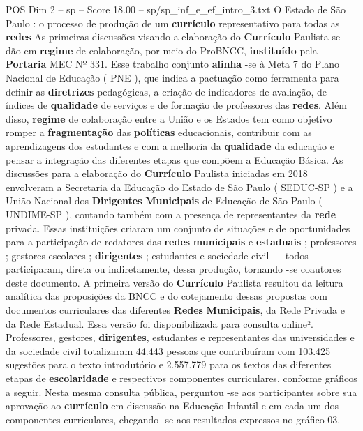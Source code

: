 \begin{textsample}{POS Dim 2 – sp – Score 18.00 – sp/sp\_inf\_e\_ef\_intro\_3.txt}  \label{ex:f2_pos_205}
O Estado de São Paulo : o processo de produção de um \textbf{currículo} representativo para todas as \textbf{redes} As primeiras discussões visando a elaboração do \textbf{Currículo} Paulista se dão em \textbf{regime} de colaboração, por meio do ProBNCC, \textbf{instituído} pela \textbf{Portaria} MEC Nº 331.
Esse trabalho conjunto \textbf{alinha} -se à Meta 7 do Plano Nacional de Educação ( PNE ), que indica a pactuação como ferramenta para definir as \textbf{diretrizes} pedagógicas, a criação de indicadores de avaliação, de índices de \textbf{qualidade} de serviços e de formação de professores das \textbf{redes}.
Além disso, \textbf{regime} de colaboração entre a União e os Estados tem como objetivo romper a \textbf{fragmentação} das \textbf{políticas} educacionais, contribuir com as aprendizagens dos estudantes e com a melhoria da \textbf{qualidade} da educação e pensar a integração das diferentes etapas que compõem a Educação Básica.
As discussões para a elaboração do \textbf{Currículo} Paulista iniciadas em 2018 envolveram a Secretaria da Educação do Estado de São Paulo ( SEDUC-SP ) e a União Nacional dos \textbf{Dirigentes} \textbf{Municipais} de Educação de São Paulo ( UNDIME-SP ), contando também com a presença de representantes da \textbf{rede} privada.
Essas instituições criaram um conjunto de situações e de oportunidades para a participação de redatores das \textbf{redes} \textbf{municipais} e \textbf{estaduais} ; professores ; gestores escolares ; \textbf{dirigentes} ; estudantes e sociedade civil — todos participaram, direta ou indiretamente, dessa produção, tornando -se coautores deste documento.
A primeira versão do \textbf{Currículo} Paulista resultou da leitura analítica das proposições da BNCC e do cotejamento dessas propostas com documentos curriculares das diferentes \textbf{Redes} \textbf{Municipais}, da Rede Privada e da Rede Estadual.
Essa versão foi disponibilizada para consulta online².
Professores, gestores, \textbf{dirigentes}, estudantes e representantes das universidades e da sociedade civil totalizaram 44.443 pessoas que contribuíram com 103.425 sugestões para o texto introdutório e 2.557.779 para os textos das diferentes etapas de \textbf{escolaridade} e respectivos componentes curriculares, conforme gráficos a seguir.
Nesta mesma consulta pública, perguntou -se aos participantes sobre sua aprovação ao \textbf{currículo} em discussão na Educação Infantil e em cada um dos componentes curriculares, chegando -se aos resultados expressos no gráfico 03.

\end{textsample}
